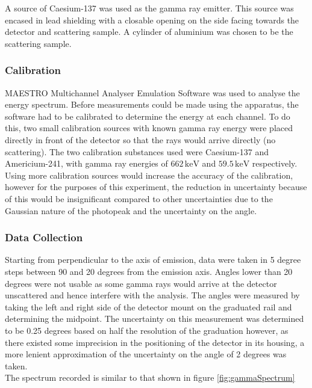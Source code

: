 \documentclass[%
reprint,
amsmath,amssymb,
aps,
]{revtex4-2}
\begin{document}
			A source of Caesium-137 was used as the gamma ray emitter. This source was encased in lead shielding with a closable opening on the side facing towards the detector and scattering sample. A cylinder of aluminium was chosen to be the scattering sample.
			
			\subsubsection{Calibration}			
			
			MAESTRO Multichannel Analyser Emulation Software was used to analyse the energy spectrum. Before measurements could be made using the apparatus, the software had to be calibrated to determine the energy at each channel. To do this, two small calibration sources with known gamma ray energy were placed directly in front of the detector so that the rays would arrive directly (no scattering). The two calibration substances used were Caesium-137 and Americium-241, with gamma ray energies of $662 \,\text{keV}$ and $59.5 \,\text{keV}$ respectively. Using more calibration sources would increase the accuracy of the calibration, however for the purposes of this experiment, the reduction in uncertainty because of this would be insignificant compared to other uncertainties due to the Gaussian nature of the photopeak and the uncertainty on the angle.\\
			
			\subsubsection{Data Collection}			
			
			Starting from perpendicular to the axis of emission, data were taken in 5 degree steps between 90 and 20 degrees from the emission axis. Angles lower than 20 degrees were not usable as some gamma rays would arrive at the detector unscattered and hence interfere with the analysis. The angles were measured by taking the left and right side of the detector mount on the graduated rail and determining the midpoint. The uncertainty on this measurement was determined to be 0.25 degrees based on half the resolution of the graduation however, as there existed some imprecision in the positioning of the detector in its housing, a more lenient approximation of the uncertainty on the angle of 2 degrees was taken.\\
			
			The spectrum recorded is similar to that shown in figure \ref{fig:gammaSpectrum}
			
\end{document}
